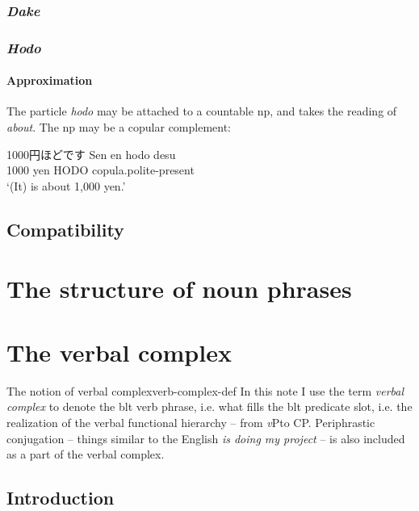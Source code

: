 \documentclass[UTF8, a4paper, oneside, scheme=plain]{ctexrep}
\newcommand*{\term}[1]{\emph{#1}}
\newcommand{\corpus}[1]{\emph{#1}}
\newcommand{\translate}[1]{`#1'}
\newcommand{\vP}{\textit{v}P}
\begin{document}
\subsection{\corpus{Dake}}\label{sec:dake}

\subsection{\corpus{Hodo}}

\subsubsection{Approximation}

The particle \corpus{hodo} may be attached to a countable \ac{np},
and takes the reading of \corpus{about}.
The \ac{np} may be a copular complement:
\begin{exe}
    \ex 1000円ほどです 
    \gll Sen en hodo desu \\
    1000 yen HODO \acs{copula}.\acs{polite}-\acs{present} \\
    \glt \translate{(It) is about 1,000 yen.}
\end{exe}

\section{Compatibility}\label{sec:particle-compatible}



\chapter{The structure of noun phrases}

\chapter{The verbal complex}\label{chap:verb-complex}

\begin{theorybox}{The notion of verbal complex}{verb-complex-def}
    In this note I use the term \term{verbal complex} to denote the \ac{blt} verb phrase,
    i.e. what fills the \ac{blt} predicate slot,
    i.e. the realization of the verbal functional hierarchy -- from \vP to CP.
    Periphrastic conjugation -- things similar to the English \corpus{is doing my project} -- 
    is also included as a part of the verbal complex.
\end{theorybox}

\section{Introduction}
\end{document}
